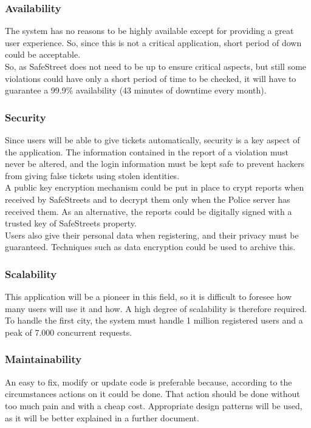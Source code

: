 \subsubsection{Availability}
	The system has no reasons to be highly available except for providing a great
user experience. So, since this is not a critical application, short period of
down could be acceptable.\\
	So, as SafeStreet does not need to be up to ensure critical aspects, but still some violations could have only a short period of time to be checked, it will have to guarantee a 99.9\% availability (43 minutes of downtime every month).

\subsubsection{Security}
    Since users will be able to give tickets automatically, security is a key aspect of the application.
    The information contained in the report of a violation must never be altered, and the login information
    must be kept safe to prevent hackers from giving false tickets using stolen identities.\\
    A public key encryption mechanism could be put in place to crypt reports when received by SafeStreets and to decrypt them only when the Police server has received them. As an alternative, the reports could be digitally signed with a trusted key of SafeStreets property.\\
  	Users also give their personal data when registering, and their privacy must be guaranteed. Techniques such as data encryption could be used to archive this.

\subsubsection{Scalability}
    This application will be a pioneer in this field, so it is difficult to foresee how many users will
    use it and how. A high degree of scalability is therefore required. To handle the first city,
    the system must handle 1 million registered users and a peak of 7.000 concurrent requests.
    
\subsubsection{Maintainability}
	An easy	to	fix, modify or update code is preferable because,	according	to	the	circumstances actions on it could be done. That action should be done without too much pain and with a cheap cost.		
	Appropriate	design	patterns	will	be	used,	as	it	will	be	better	explained	in	a	further	document.    
	
